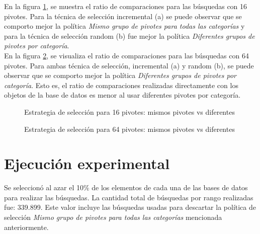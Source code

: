 En la figura \ref{fig:same-vs-diff-16Pivotes}, se muestra el ratio de comparaciones para las b\'usquedas con 16 pivotes. Para la t\'ecnica de selecci\'on incremental (a) se puede observar que se comporto mejor la pol\'itica \textit{Mismo grupo de pivotes para todas las categor\'ias} y para la t\'ecnica de selecci\'on random (b) fue mejor la pol\'itica \textit{Diferentes grupos de pivotes por categor\'ia}.\\

En la figura \ref{fig:same-vs-diff-64Pivotes}, se visualiza el ratio de comparaciones para las b\'usquedas con 64 pivotes. Para ambas t\'ecnica de selecci\'on, incremental (a) y random (b), se puede observar que se comporto mejor la pol\'itica \textit{Diferentes grupos de pivotes por categor\'ia}. Esto es, el ratio de comparaciones realizadas directamente con los objetos de la base de datos es menor al usar diferentes pivotes por categor\'ia.\\

\begin{figure}[tb]
\centering
{}
		\caption{\small Estrategia de selecci\'on para 16 pivotes: mismos pivotes vs diferentes}
		\label{fig:same-vs-diff-16Pivotes}
\end{figure}

\begin{figure}[tb]
\centering
{}
		\caption{\small Estrategia de selecci\'on para 64 pivotes: mismos pivotes vs diferentes}
		\label{fig:same-vs-diff-64Pivotes}
\end{figure}

\section{Ejecuci\'on experimental}

Se seleccion\'o al azar el 10\% de los elementos de cada una de las bases de datos para realizar las b\'usquedas. La cantidad total de b\'usquedas por rango realizadas fue: 339.899. Este valor incluye las b\'usquedas usadas para descartar la pol\'itica de selecci\'on \textit{Mismo grupo de pivotes para todas las categor\'ias } mencionada anteriormente.\\

